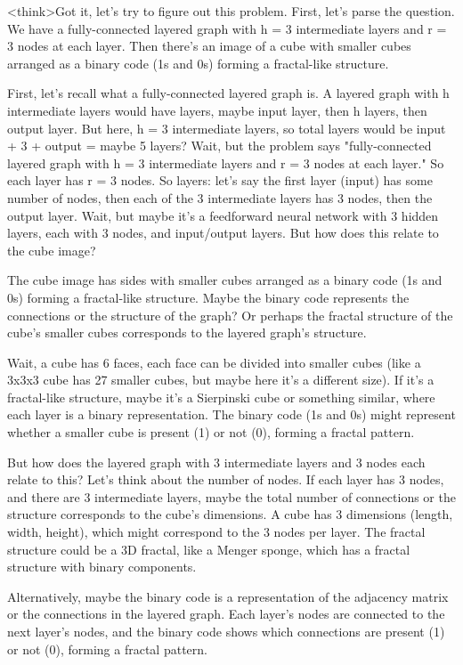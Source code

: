 <think>Got it, let's try to figure out this problem. First, let's parse the question. We have a fully-connected layered graph with h = 3 intermediate layers and r = 3 nodes at each layer. Then there's an image of a cube with smaller cubes arranged as a binary code (1s and 0s) forming a fractal-like structure. 

First, let's recall what a fully-connected layered graph is. A layered graph with h intermediate layers would have layers, maybe input layer, then h layers, then output layer. But here, h = 3 intermediate layers, so total layers would be input + 3 + output = maybe 5 layers? Wait, but the problem says "fully-connected layered graph with h = 3 intermediate layers and r = 3 nodes at each layer." So each layer has r = 3 nodes. So layers: let's say the first layer (input) has some number of nodes, then each of the 3 intermediate layers has 3 nodes, then the output layer. Wait, but maybe it's a feedforward neural network with 3 hidden layers, each with 3 nodes, and input/output layers. But how does this relate to the cube image?

The cube image has sides with smaller cubes arranged as a binary code (1s and 0s) forming a fractal-like structure. Maybe the binary code represents the connections or the structure of the graph? Or perhaps the fractal structure of the cube's smaller cubes corresponds to the layered graph's structure.

Wait, a cube has 6 faces, each face can be divided into smaller cubes (like a 3x3x3 cube has 27 smaller cubes, but maybe here it's a different size). If it's a fractal-like structure, maybe it's a Sierpinski cube or something similar, where each layer is a binary representation. The binary code (1s and 0s) might represent whether a smaller cube is present (1) or not (0), forming a fractal pattern.

But how does the layered graph with 3 intermediate layers and 3 nodes each relate to this? Let's think about the number of nodes. If each layer has 3 nodes, and there are 3 intermediate layers, maybe the total number of connections or the structure corresponds to the cube's dimensions. A cube has 3 dimensions (length, width, height), which might correspond to the 3 nodes per layer. The fractal structure could be a 3D fractal, like a Menger sponge, which has a fractal structure with binary components.

Alternatively, maybe the binary code is a representation of the adjacency matrix or the connections in the layered graph. Each layer's nodes are connected to the next layer's nodes, and the binary code shows which connections are present (1) or not (0), forming a fractal pattern.

